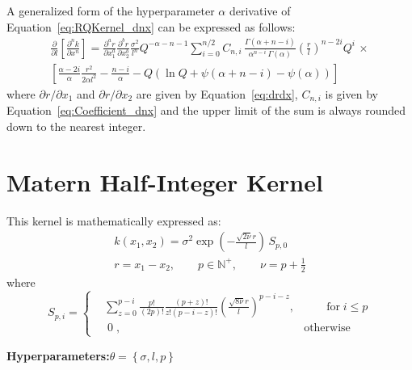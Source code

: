\documentclass{article}
\begin{document}
A generalized form of the hyperparameter $\alpha$ derivative of Equation~\eqref{eq:RQKernel_dnx} can be expressed as follows:
\begin{multline}
\label{eq:RQKernel_da_dnx}
	\frac{\partial}{\partial l} \left[\frac{\partial^n k}{\partial x^n}\right] = \frac{\partial^a r}{\partial x_1^a} \frac{\partial^b r}{\partial x_2^b} \frac{\sigma^2}{l^n} Q^{-\alpha - n - 1} \sum_{i=0}^{n/2}  C_{n,i} \, \frac{\Gamma\!\left(\alpha + n - i\right)}{\alpha^{n-i} \, \Gamma\!\left(\alpha\right)} \left(\frac{r}{l}\right)^{n-2i} Q^i \, \times \\
	\left[\frac{\alpha - 2i}{\alpha} \frac{r^2}{2 \alpha l^2} - \frac{n - i}{\alpha} - Q \left(\ln{Q} + \psi\!\left(\alpha + n - i\right) - \psi\!\left(\alpha\right)\right)\right]
\end{multline}
where $\partial r/\partial x_1$ and $\partial r/\partial x_2$ are given by Equation~\eqref{eq:drdx}, $C_{n,i}$ is given by Equation~\eqref{eq:Coefficient_dnx} and the upper limit of the sum is always rounded down to the nearest integer.

\section{Matern Half-Integer Kernel}
\label{sec:MHKernel}

This kernel is mathematically expressed as:
\begin{equation}
\label{eq:MHKernel}
	\begin{gathered}
	k\!\left(x_1,x_2\right) = \sigma^2 \exp{\left(-\frac{\sqrt{2 \nu} r}{l}\right)} \, S_{p,0} \\
	r = x_1 - x_2, \qquad p \in \mathbb{N}^+, \qquad \nu = p + \frac{1}{2}
	\end{gathered}
\end{equation}
where
\begin{equation}
\label{eq:MHKernel_S}
	S_{p,i} = \left\{
	\begin{aligned}
	&\sum_{z=0}^{p-i} \frac{p!}{\left(2p\right)!} \frac{\left(p + z\right)!}{z! \left(p - i - z\right)!} \left(\frac{\sqrt{8 \nu} r}{l}\right)^{p-i-z} , &\qquad \text{for} \; i \le p \\
	&\; 0 \; , &\text{otherwise}
	\end{aligned}
	\right.
\end{equation}

\begin{center}
	\textbf{Hyperparameters:}\hspace{20pt}$\theta = \left\lbrace \sigma,l,p \right\rbrace$
\end{center}
\end{document}
